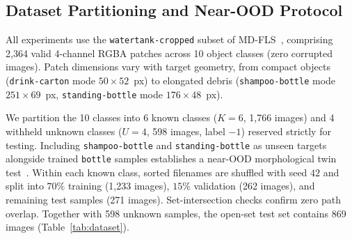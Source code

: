 \documentclass[conference]{IEEEtran}
\begin{document}
\subsection{Dataset Partitioning and Near-OOD Protocol}
\label{sec:dataset}

All experiments use the \texttt{watertank-cropped} subset of MD-FLS~\cite{singh_2021_iccvw,valdenegro_2025_datasets}, comprising 2,364 valid 4-channel RGBA patches across 10 object classes (zero corrupted images). Patch dimensions vary with target geometry, from compact objects (\texttt{drink-carton} mode $50\times 52$~px) to elongated debris (\texttt{shampoo-bottle} mode $251\times 69$~px, \texttt{standing-bottle} mode $176\times 48$~px).

We partition the 10 classes into 6 known classes ($K=6$, 1,766 images) and 4 withheld unknown classes ($U=4$, 598 images, label $-1$) reserved strictly for testing. Including \texttt{shampoo-bottle} and \texttt{standing-bottle} as unseen targets alongside trained \texttt{bottle} samples establishes a near-OOD morphological twin test~\cite{vaze_2022_osr}. Within each known class, sorted filenames are shuffled with seed $42$ and split into $70\%$ training (1,233 images), $15\%$ validation (262 images), and remaining test samples (271 images). Set-intersection checks confirm zero path overlap. Together with 598 unknown samples, the open-set test set contains 869 images (Table~\ref{tab:dataset}).
\end{document}
